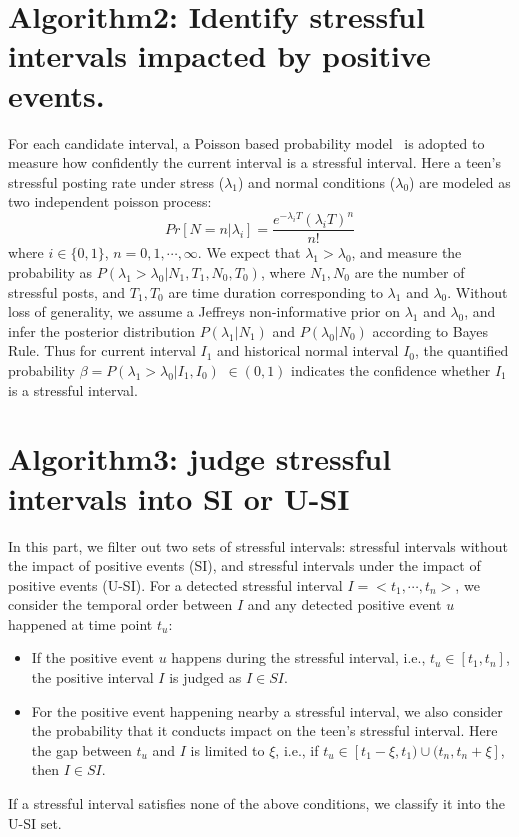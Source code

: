 \section{Algorithm2: Identify stressful intervals impacted by positive events.}
\label{alg:alg2}
For each candidate interval,
a Poisson based probability model~\cite{Li2017Analyzing} is adopted to measure how confidently the current interval is a stressful interval.
Here a teen's stressful posting rate under stress ($\lambda_1$) and normal conditions ($\lambda_0$) are modeled as two independent poisson process:
\begin{equation}
Pr[N=n|\lambda_i]=\frac{e^{-\lambda_i T}{(\lambda_i T)}^n}{n!}
\end{equation}
where $i\in\{0,1\}$, $n=0,1,\cdots,\infty$.
We expect that $\lambda_1 > \lambda_0$, and measure the probability as $P(\lambda_1>\lambda_0|N_1, T_1, N_0, T_0)$,
where $N_1, N_0$ are the number of stressful posts, and $T_1, T_0$ are time duration corresponding to $\lambda_1$ and $\lambda_0$.
Without loss of generality, we assume a Jeffreys non-informative prior on $\lambda_1$ and $\lambda_0$,
and infer the posterior distribution $P(\lambda_1|N_1)$ and $P(\lambda_0|N_0)$ according to Bayes Rule.
Thus for current interval $I_1$ and historical normal interval $I_0$,
the quantified probability $\beta = P(\lambda_1>\lambda_0|I_1,I_0)$ $\in (0,1)$ indicates the confidence whether $I_1$ is a stressful interval.


\section{Algorithm3: judge stressful intervals into SI or U-SI}
\label{alg:alg3}
In this part, we filter out two sets of stressful intervals: stressful intervals without the impact of positive events (SI),
and stressful intervals under the impact of positive events (U-SI).
For a detected stressful interval $I = <t_1,\cdots,t_n>$, we consider the temporal order between $I$ and any detected positive event $u$ happened at time point $t_u$:
\begin{itemize}
\item If the positive event $u$ happens during the stressful interval, i.e., $t_u \in [t_1,t_n]$, the positive interval $I$ is judged as $I \in SI$.
\item For the positive event happening nearby a stressful interval,
we also consider the probability that it conducts impact on the teen's stressful interval.
Here the gap between $t_u$ and $I$ is limited to $\xi$, i.e.,
if $t_u \in [t_{1}-\xi, t_1)\cup(t_{n},t_{n}+\xi]$, then $I \in SI$.
\end{itemize}
If a stressful interval satisfies none of the above conditions, we classify it into the U-SI set.

